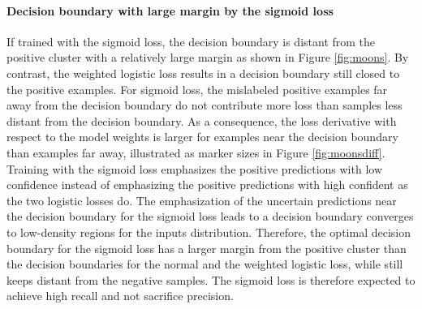 \paragraph{Decision boundary with large margin by the sigmoid loss}
If trained with the sigmoid loss, the decision boundary is distant from the positive cluster with a relatively large margin as shown in Figure \ref{fig:moons}.
By contrast, the weighted logistic loss results in a decision boundary still closed to the positive examples.
For sigmoid loss, the mislabeled positive examples far away from the decision boundary do not contribute more loss than samples less distant from the decision boundary.
As a consequence, the loss derivative with respect to the model weights is larger for examples near the decision boundary than examples far away, illustrated as marker sizes in Figure \ref{fig:moonsdiff}.
Training with the sigmoid loss emphasizes the positive predictions with low confidence instead of emphasizing the positive predictions with high confident as the two logistic losses do.
The emphasization of the uncertain predictions near the decision boundary for the sigmoid loss leads to a decision boundary converges to low-density regions for the inputs distribution.
Therefore, the optimal decision boundary for the sigmoid loss has a larger margin from the positive cluster than the decision boundaries for the normal and the weighted logistic loss, while still keeps distant from the negative samples.
The sigmoid loss is therefore expected to achieve high recall and not sacrifice precision.



